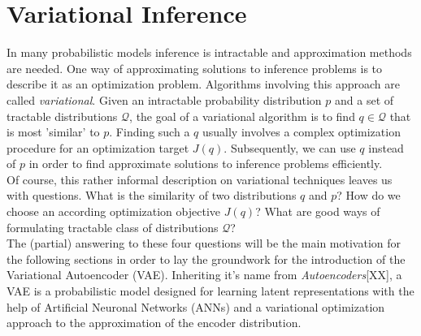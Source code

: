 \documentclass[12pt]{report}
\theoremstyle{definition}
\begin{document}
\section{Variational Inference}

In many probabilistic models inference is intractable and approximation methods are needed. One way of approximating solutions to inference problems is to describe it as an optimization problem. Algorithms involving this approach are called \emph{variational}.
Given an intractable probability distribution $p$ and a set of tractable distributions $\mathcal{Q}$, the goal of a variational algorithm is to find $q \in \mathcal{Q}$ that is most 'similar' to $p$. Finding such a $q$ usually involves a complex optimization procedure for an optimization target $J(q)$. Subsequently, we can use $q$ instead of $p$ in order to find approximate solutions to inference problems efficiently.\\
Of course, this rather informal description on variational techniques leaves us with questions. What is the similarity of two distributions $q$ and $p$? How do we choose an according optimization objective $J(q)$? What are good ways of formulating tractable class of distributions $\mathcal{Q}$? \\
The (partial) answering to these four questions will be the main motivation for the following sections in order to lay the groundwork for the introduction of the Variational Autoencoder (VAE). Inheriting it's name from \emph{Autoencoders}[XX], a VAE is a probabilistic model designed for learning latent representations with the help of Artificial Neuronal Networks (ANNs) and a variational optimization approach to the approximation of the encoder distribution.
\end{document}
